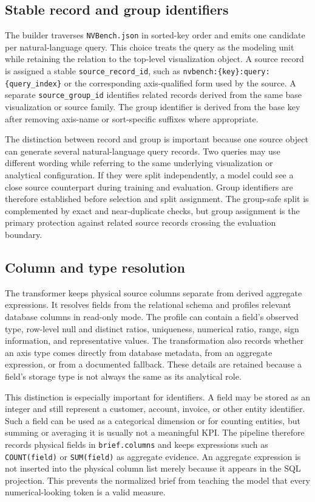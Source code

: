 \subsection{Stable record and group identifiers}

The builder traverses \texttt{NVBench.json} in sorted-key order and emits one candidate per natural-language query. This choice treats the query as the modeling unit while retaining the relation to the top-level visualization object. A source record is assigned a stable \texttt{source\_record\_id}, such as \texttt{nvbench:\{key\}:query:\{query\_index\}} or the corresponding axis-qualified form used by the source. A separate \texttt{source\_group\_id} identifies related records derived from the same base visualization or source family. The group identifier is derived from the base key after removing axis-name or sort-specific suffixes where appropriate.

The distinction between record and group is important because one source object can generate several natural-language query records. Two queries may use different wording while referring to the same underlying visualization or analytical configuration. If they were split independently, a model could see a close source counterpart during training and evaluation. Group identifiers are therefore established before selection and split assignment. The group-safe split is complemented by exact and near-duplicate checks, but group assignment is the primary protection against related source records crossing the evaluation boundary.

\subsection{Column and type resolution}

The transformer keeps physical source columns separate from derived aggregate expressions. It resolves fields from the relational schema and profiles relevant database columns in read-only mode. The profile can contain a field's observed type, row-level null and distinct ratios, uniqueness, numerical ratio, range, sign information, and representative values. The transformation also records whether an axis type comes directly from database metadata, from an aggregate expression, or from a documented fallback. These details are retained because a field's storage type is not always the same as its analytical role.

This distinction is especially important for identifiers. A field may be stored as an integer and still represent a customer, account, invoice, or other entity identifier. Such a field can be used as a categorical dimension or for counting entities, but summing or averaging it is usually not a meaningful KPI. The pipeline therefore records physical fields in \texttt{brief.columns} and keeps expressions such as \texttt{COUNT(field)} or \texttt{SUM(field)} as aggregate evidence. An aggregate expression is not inserted into the physical column list merely because it appears in the SQL projection. This prevents the normalized brief from teaching the model that every numerical-looking token is a valid measure.

